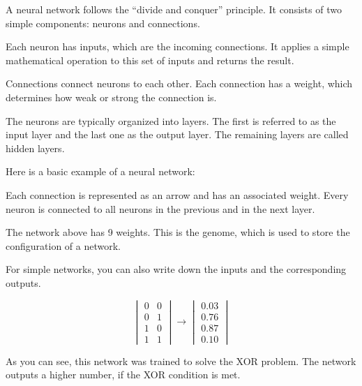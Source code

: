 A neural network follows the “divide and conquer” principle. It consists of two simple components: neurons and connections.

Each neuron has inputs, which are the incoming connections. It applies a simple mathematical operation to this set of inputs and returns the result.

Connections connect neurons to each other. Each connection has a weight, which determines how weak or strong the connection is.

The neurons are typically organized into layers. The first is referred to as the input layer and the last one as the output layer. The remaining layers are called hidden layers. \cite{Anderson1995}

Here is a basic example of a neural network:

{\centering
	\begin{neuralnetwork}[height=3, nodespacing=1.5cm]
		\newcommand{\nodelabel}[2]{
			\ifnum#1=0 $x_#2$ \fi
			\ifnum#1=1 $y_#2$ \fi
			\ifnum#1=2 $z_#2$ \fi
		}
		\setdefaultnodetext{\nodelabel}
		\hiddenlayer[count=3, bias=false, title=Hidden] \linklayers
		\outputlayer[count=1, title=Output] \linklayers
	\end{neuralnetwork}
\par}

Each connection is represented as an arrow and has an associated weight. Every neuron is connected to all neurons in the previous and in the next layer.

The network above has 9 weights. This is the genome, which is used to store the configuration of a network. \cite{Stanley2002}

For simple networks, you can also write down the inputs and the corresponding outputs.

\[
	\begin{vmatrix} 0 & 0 \\ 0 & 1 \\ 1 & 0 \\ 1 & 1 \end{vmatrix}
	\rightarrow
	\begin{vmatrix} 0.03 \\ 0.76 \\ 0.87 \\ 0.10 \end{vmatrix}	
\]

As you can see, this network was trained to solve the XOR problem. The network outputs a higher number, if the XOR condition is met.
